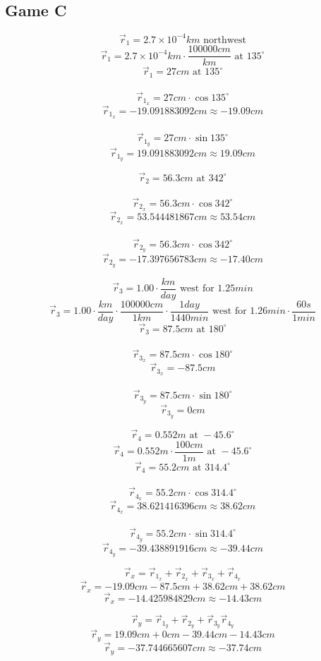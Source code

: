 \documentclass[11pt, letterpaper, includehead]{article}
\begin{document}
\subsection{Game C} %

$$\vec{r}_1 = 2.7\times10^{-4}km \text{ northwest}$$
$$\vec{r}_1 = 2.7\times10^{-4}km \cdot\frac{100000cm}{km}\text{ at }135^{\circ}$$
$$\vec{r}_1 = 27cm \text{ at }135^{\circ}$$\\
$$\vec{r}_{1_x} = 27cm\cdot\cos135^{\circ}$$
$$\vec{r}_{1_x} = -19.091883092cm \approx -19.09cm$$\\
$$\vec{r}_{1_y} = 27cm\cdot\sin135^{\circ}$$
$$\vec{r}_{1_y} = 19.091883092cm \approx 19.09cm$$

$$\vec{r}_2 = 56.3cm \text{ at } 342^{\circ}$$\\
$$\vec{r}_{2_x} = 56.3cm\cdot\cos342^{\circ}$$
$$\vec{r}_{2_x} = 53.544481867cm \approx 53.54cm$$\\
$$\vec{r}_{2_y} = 56.3cm\cdot\cos342^{\circ}$$
$$\vec{r}_{2_y} = -17.397656783cm \approx -17.40cm$$

$$\vec{r}_3 = 1.00\cdot\frac{km}{day} \text{ west for }1.25min$$
$$\vec{r}_3 = 1.00\cdot\frac{km}{day}\cdot\frac{100000cm}{1km}\cdot\frac{1day}{1440min}\text{ west for }1.26min\cdot\frac{60s}{1min}$$
$$\vec{r}_3 = 87.5cm\text{ at }180^{\circ}$$\\
$$\vec{r}_{3_x} = 87.5cm\cdot\cos180^{\circ}$$
$$\vec{r}_{3_x} = -87.5cm$$\\
$$\vec{r}_{3_y} = 87.5cm\cdot\sin180^{\circ}$$
$$\vec{r}_{3_y} = 0cm$$

$$\vec{r}_4 = 0.552m \text{ at } -45.6^{\circ}$$
$$\vec{r}_4 = 0.552m\cdot\frac{100cm}{1m} \text{ at } -45.6^{\circ}$$
$$\vec{r}_4 = 55.2cm \text{ at } 314.4^{\circ}$$\\
$$\vec{r}_{4_x} = 55.2cm\cdot\cos314.4^{\circ}$$
$$\vec{r}_{4_x} = 38.621416396cm \approx 38.62cm$$\\
$$\vec{r}_{4_y} = 55.2cm\cdot\sin314.4^{\circ}$$
$$\vec{r}_{4_y} = -39.438891916cm \approx -39.44cm$$

$$\vec{r}_x = \vec{r}_{1_x} + \vec{r}_{2_x} + \vec{r}_{3_x} + \vec{r}_{4_x}$$
$$\vec{r}_x = -19.09cm -87.5cm + 38.62cm + 38.62cm$$
$$\vec{r}_x = -14.425984829cm \approx -14.43cm$$

$$\vec{r}_y = \vec{r}_{1_y} + \vec{r}_{2_y} + \vec{r}_{3_y} \vec{r}_{4_y}$$
$$\vec{r}_y = 19.09cm + 0cm -39.44cm -14.43cm$$
$$\vec{r}_y = -37.744665607cm \approx -37.74cm$$
\end{document}
